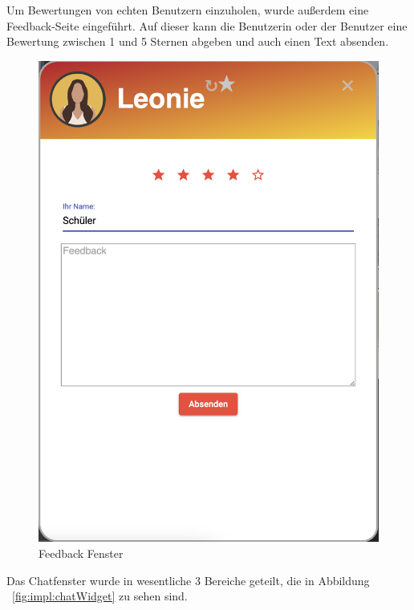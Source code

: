 Um Bewertungen von echten Benutzern einzuholen, wurde außerdem eine Feedback-Seite eingeführt.
Auf dieser kann die Benutzerin oder der Benutzer eine Bewertung zwischen 1 und 5 Sternen abgeben und auch einen Text absenden.

\begin{figure}[hbt!]
    \centering
    \includegraphics[scale=0.3]{pics/feedback}
    \caption{Feedback Fenster}
    \label{fig:impl:feedback}
\end{figure}

Das Chatfenster wurde in wesentliche 3 Bereiche geteilt, die in Abbildung ~\ref{fig:impl:chatWidget} zu sehen sind.


